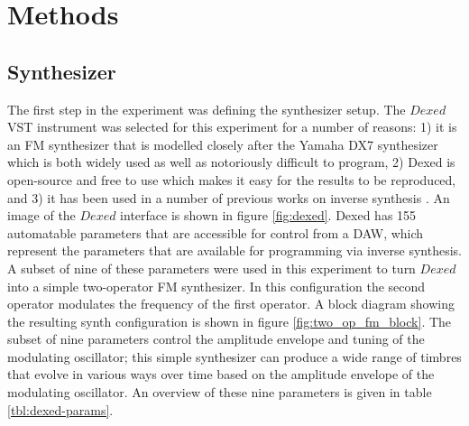 \section{Methods}

\subsection{Synthesizer}
The first step in the experiment was defining the synthesizer setup. The $Dexed$ VST instrument was selected for this experiment for a number of reasons: 1) it is an FM synthesizer that is modelled closely after the Yamaha DX7 synthesizer which is both widely used as well as notoriously difficult to program, 2) Dexed is open-source and free to use which makes it easy for the results to be reproduced, and 3) it has been used in a number of previous works on inverse synthesis \cite{yee2018automatic, luke2019stochastic, le2021improving, masudo2021quality}. An image of the $Dexed$ interface is shown in figure \ref{fig:dexed}. Dexed has 155 automatable parameters that are accessible for control from a DAW, which represent the parameters that are available for programming via inverse synthesis. A subset of nine of these parameters were used in this experiment to turn $Dexed$ into a simple two-operator FM synthesizer. In this configuration the second operator modulates the frequency of the first operator. A block diagram showing the resulting synth configuration is shown in figure \ref{fig:two_op_fm_block}. The subset of nine parameters control the amplitude envelope and tuning of the modulating oscillator; this simple synthesizer can produce a wide range of timbres that evolve in various ways over time based on the amplitude envelope of the modulating oscillator. An overview of these nine parameters is given in table \ref{tbl:dexed-params}.

